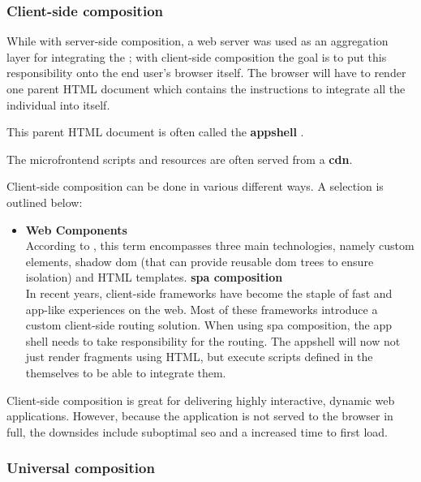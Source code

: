 \subsubsection{Client-side composition}

While with server-side composition, a web server was used as an aggregation
layer for integrating the ; with client-side
composition the goal is to put this responsibility onto the end user's browser
itself. The browser will have to render one parent HTML document which contains
the instructions to integrate all the individual  into
itself.

This parent HTML document is often called the \textbf{\gls{appshell}}
\autocite{Geers_2020}\autocite{Rappl_2021}. 

The \gls{microfrontend} scripts and resources are often served from a
\textbf{\gls{cdn}}.

Client-side composition can be done in various different ways. A selection is
outlined below:
\begin{itemize}
  \item \textbf{Web Components}\\
  According to \textcite{Mozilla_WebComponents}, this term encompasses three
  main technologies, namely custom elements, shadow \gls{dom} (that can provide
  reusable \gls{dom} trees to ensure isolation) and HTML templates.
  \spacedItem \textbf{\Gls{spa} composition}\\
  In recent years, client-side frameworks have become the staple of fast and
  app-like experiences on the web. Most of these frameworks introduce a custom
  client-side routing solution. When using \gls{spa} composition, the app shell
  needs to take responsibility for the routing. The \gls{appshell} will now not
  just render fragments using HTML, but execute scripts defined in the
   themselves to be able to integrate them.
\end{itemize}

Client-side composition is great for delivering highly interactive, dynamic web
applications. However, because the application is not served to the browser in
full, the downsides include suboptimal \gls{seo} and a increased time to first
load.

\subsubsection{Universal composition}
\label{sssec:universal-composition}

